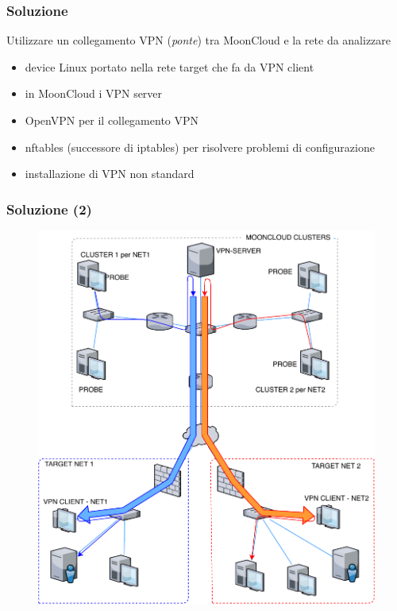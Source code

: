 \begin{frame}
	\frametitle{Soluzione}
	Utilizzare un collegamento \alert{VPN} (\textit{ponte}) tra MoonCloud e
	la rete da analizzare
		    
	\begin{itemize}
		\item device \alert{Linux} portato nella rete target che fa da VPN client
		\item in MoonCloud i \alert{VPN server}
		\item \alert{OpenVPN} per il collegamento VPN 
		\item \alert{nftables} (successore
		      di \alert{iptables}) per risolvere problemi di configurazione
		      		      		      
	\end{itemize}
		    
	\begin{itemize}
		\item installazione di \alert{VPN non standard} 
	\end{itemize}
\end{frame}

\begin{frame}
	\frametitle{Soluzione (2)}
	\begin{figure}
		\includegraphics[scale=0.45]{img/ls}
	\end{figure}
\end{frame}


